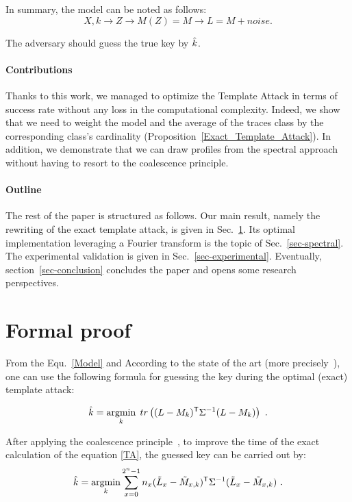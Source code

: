 \documentclass[conference,twocolumn]{IEEEtran}
\DeclareMathOperator*\argmin{argmin}
\begin{document}
In summary, the model can be noted as follows: 
\begin{equation}
 X, k \longrightarrow Z \longrightarrow M(Z) = M \longrightarrow L = M + noise.
\label{Model}
\end{equation}

The adversary should guess the true key by $\Hat{k}$.    

\paragraph{Contributions} 
  Thanks to this work, we managed to optimize the Template Attack in terms of success rate without any loss in the computational complexity.
  Indeed, we show that we need to weight the model and the average of the traces class by the corresponding class's cardinality (Proposition~\ref{Exact_Template_Attack}). 
  In addition, we demonstrate that we can draw profiles from the spectral approach without having to resort to the coalescence principle. 
  
\paragraph{Outline}
The rest of the paper is structured as follows.
Our main result, namely the rewriting of the exact template attack, is given in Sec.~\ref{sec-formal}.
Its optimal implementation leveraging a Fourier transform is the topic of Sec.~\ref{sec-spectral}.
The experimental validation is given in Sec.~\ref{sec-experimental}.
Eventually, section~\ref{sec-conclusion} concludes the paper and opens some research perspectives.

\section{Formal proof}\label{sec-formal}

 From the Equ.~\eqref{Model} and According to the state of the art (more precisely~\cite[Theorem~2]{DBLP:journals/jce/BruneauGHMR17}), %
 one can use the following formula for guessing the key during the optimal (exact) template attack:
 
\begin{equation}
\Hat{k} = \argmin_k \; tr \left( (L-M_k)^\mathsf{T} \Sigma^{-1} (L-M_k) \right) \ .
\label{TA}
\end{equation}

After applying the coalescence principle~\cite{OULADJ2019}, to improve the time of the exact calculation of the equation \eqref{TA}, the guessed key can be carried out by:
%
\begin{equation}
\Hat{k} = \argmin_k \sum_{x=0}^{2^n-1} n_x(\Tilde{L}_x - \Tilde{M}_{x, k})^\mathsf{T} \Sigma^{-1} ( \Tilde{L}_x  -  \Tilde{M}_{x, k}) \ .
\label{coalesced_TA}
\end{equation}
\end{document}
